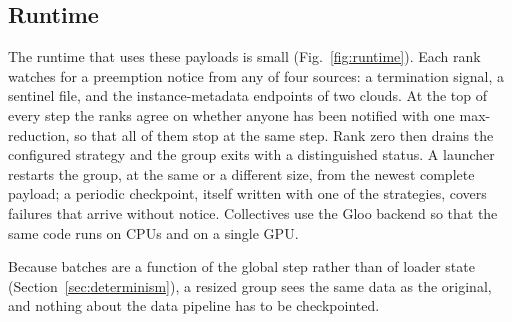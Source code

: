 \subsection{Runtime}


The runtime that uses these payloads is small (Fig.~\ref{fig:runtime}). Each rank watches for a preemption notice from any of four sources: a
termination signal, a sentinel file, and the instance-metadata endpoints of two clouds. At the top of every step the
ranks agree on whether anyone has been notified with one max-reduction, so that all of them stop at the same step. Rank
zero then drains the configured strategy and the group exits with a distinguished status. A launcher restarts the group,
at the same or a different size, from the newest complete payload; a periodic checkpoint, itself written with one of
the strategies, covers failures that arrive without notice. Collectives use the Gloo backend so that the same code runs
on CPUs and on a single GPU.

Because batches are a function of the global step rather than of loader state (Section~\ref{sec:determinism}), a
resized group sees the same data as the original, and nothing about the data pipeline has to be checkpointed.
